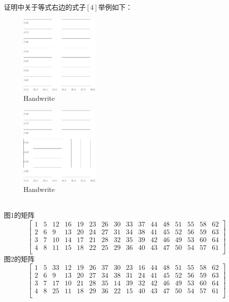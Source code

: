 \documentclass[twoside,a4paper,CCT]{cctart}   %
\begin{document}
证明中关于等式右边的式子$[4]$举例如下：
\begin{figure}[htbp]
  \centering
  \includegraphics[width=0.35\textwidth]{c.pdf}
  \caption{Handwrite}\label{fig:digit}
\end{figure}
\begin{figure}[htbp]
  \centering
  \includegraphics[width=0.35\textwidth]{d.pdf}
  \caption{Handwrite}\label{fig:digit}
\end{figure}\\
图1的矩阵
$$\begin{bmatrix}
1&5&12&16&19&23&26&30&33&37&44&48&51&55&58&62\\
2&6&9&13&20&24&27&31&34&38&41&45&52&56&59&63\\
3&7&10&14&17&21&28&32&35&39&42&46&49&53&60&64\\
4&8&11&15&18&22&25&29&36&40&43&47&50&54&57&61\\\end{bmatrix}$$
图2的矩阵
$$\begin{bmatrix}
1&5&33&12&19&26&37&30&23&16&44&48&51&55&58&62\\
2&6&9&13&20&27&34&38&31&24&41&45&52&56&59&63\\
3&7&17&10&21&28&35&14&39&32&42&46&49&53&60&64\\
4&8&25&11&18&29&36&22&15&40&43&47&50&54&57&61\\\end{bmatrix}$$
\end{document}
